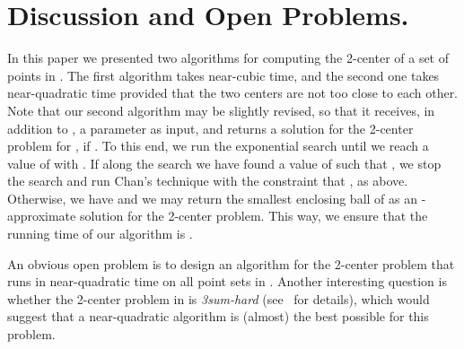 \documentclass[a4paper,12pt]{article}
\begin{document}
\section{Discussion and Open Problems.}
\label{sec:discussion} In this paper we presented two algorithms for
computing the 2-center of a set of points in . The first
algorithm takes near-cubic time, and the second one takes
near-quadratic time provided that the two centers are not too close
to each other. Note that our second algorithm may be slightly
revised, so that it receives, in addition to , a parameter
 as input, and returns a solution for the 2-center
problem for , if . To this end,
we run the exponential search until we reach a value of  with
. If along the search we have found a
value of  such that , we stop the search and run
Chan's technique with the constraint that , as above.
Otherwise, we have  and we may return the
smallest enclosing ball of  as an -approximate solution
for the 2-center problem. This way, we ensure that the running time
of our algorithm is .

An obvious open problem is to design an algorithm for the 2-center
problem that runs in near-quadratic time on all point sets in
.  Another interesting question is whether the 2-center
problem in  is \emph{{\sc 3sum}-hard} (see~\cite{GO}
for details), which would suggest that a near-quadratic algorithm is
(almost) the best possible for this problem.
\end{document}
